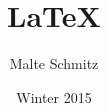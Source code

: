 \documentclass[xcolor=table]{beamer}
\author{Malte Schmitz}
\title{LaTeX}
\institute{Institut für Softwaretechnik und Programmiersprachen}
\date{Winter 2015}
\begin{document}



\livecoding

\livecoding

\livecoding

\end{document}
